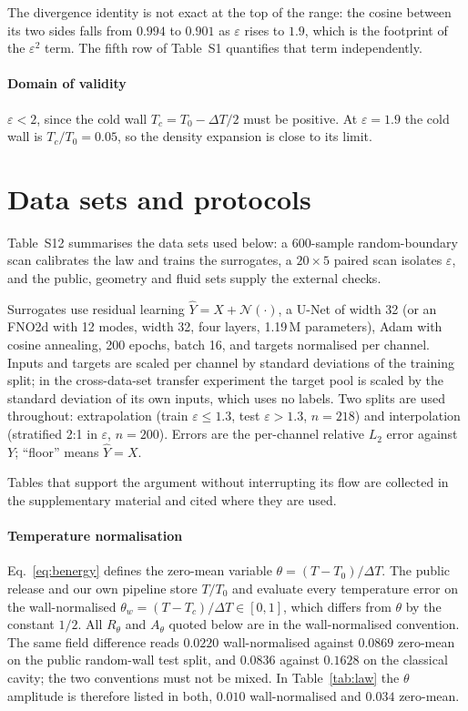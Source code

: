 \documentclass[preprint,11pt,a4paper,times,doubleblind]{elsarticle}
\begin{document}
The divergence identity is not exact at the top of the range: the cosine between its two sides
falls from $0.994$ to $0.901$ as $\varepsilon$ rises to $1.9$, which is the footprint of the
$\varepsilon^2$ term. The fifth row of Table~S1 quantifies that term independently.

\paragraph{Domain of validity} $\varepsilon<2$, since the cold wall $T_c=T_0-\Delta T/2$ must be
positive. At $\varepsilon=1.9$ the cold wall is $T_c/T_0=0.05$, so the density expansion is close
to its limit.
\section{Data sets and protocols}
\label{sec:data}

Table~S12 summarises the data sets used below: a 600-sample random-boundary scan
calibrates the law and trains the surrogates, a $20\times5$ paired scan isolates
$\varepsilon$, and the public, geometry and fluid sets supply the external checks.


Surrogates use residual learning $\hat Y=X+\mathcal{N}(\cdot)$, a U-Net of width 32 (or an FNO2d
with 12 modes, width 32, four layers, 1.19\,M parameters), Adam with cosine annealing, 200 epochs,
batch 16, and targets normalised per channel. Inputs and targets are scaled per channel by
standard deviations of the training split; in the cross-data-set transfer experiment the target
pool is scaled by the standard deviation of its own inputs, which uses no labels. Two splits are used throughout:
extrapolation (train $\varepsilon\le1.3$, test $\varepsilon>1.3$, $n=218$) and
interpolation (stratified 2:1 in $\varepsilon$, $n=200$). Errors are the per-channel
relative $L_2$ error against $Y$; ``floor'' means $\hat Y=X$.

Tables that support the argument without interrupting its flow are collected in the
supplementary material and cited where they are used.

\paragraph{Temperature normalisation} Eq.~\eqref{eq:benergy} defines the zero-mean variable
$\theta=(T-T_0)/\Delta T$. The public release and our own pipeline store $T/T_0$ and evaluate every
temperature error on the wall-normalised $\theta_w=(T-T_c)/\Delta T\in[0,1]$, which differs from
$\theta$ by the constant $1/2$. All $R_\theta$ and $A_\theta$ quoted below are in the
wall-normalised convention. The same field difference reads $0.0220$ wall-normalised against
$0.0869$ zero-mean on the public random-wall test split, and $0.0836$ against $0.1628$ on the
classical cavity; the two conventions must not be mixed. In Table~\ref{tab:law} the $\theta$
amplitude is therefore listed in both, $0.010$ wall-normalised and $0.034$ zero-mean.
\end{document}
